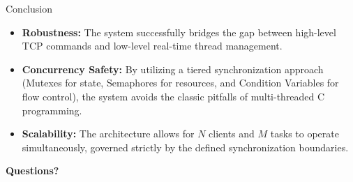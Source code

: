 \begin{frame}{Conclusion}
    \begin{itemize}
        \item \textbf{Robustness:} The system successfully bridges the gap between high-level TCP commands and low-level real-time thread management.
        \item \textbf{Concurrency Safety:} By utilizing a tiered synchronization approach (Mutexes for state, Semaphores for resources, and Condition Variables for flow control), the system avoids the classic pitfalls of multi-threaded C programming.
        \item \textbf{Scalability:} The architecture allows for $N$ clients and $M$ tasks to operate simultaneously, governed strictly by the defined synchronization boundaries.
    \end{itemize}
    \vspace{0.5cm}
    \centering
    \textbf{\Large Questions?}
\end{frame}
